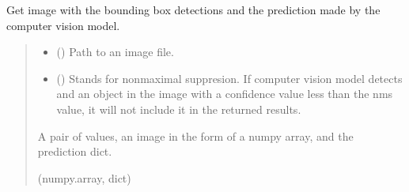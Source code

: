 \documentclass[letterpaper,10pt,english]{sphinxmanual}
\begin{document}
\begin{fulllineitems}
\begin{fulllineitems}
\begin{quote}
\begin{description}
\end{description}\end{quote}

\end{fulllineitems}


\begin{fulllineitems}
\label{\detokenize{comp_viz.object_detection:comp_viz.object_detection.model.Model.get_image_prediction}}
\pysigstartsignatures
{}
\pysigstopsignatures
\sphinxAtStartPar
Get image with the bounding box detections and the prediction made by the computer vision model.
\begin{quote}\begin{description}
\begin{itemize}
\item {} 
\sphinxAtStartPar
{} () \textendash{} Path to an image file.

\item {} 
\sphinxAtStartPar
{} () \textendash{} Stands for non\sphinxhyphen{}maximal suppresion. If computer vision model detects and an 
object in the image with a confidence value less than the nms value, it 
will not include it in the returned results.

\end{itemize}

\sphinxAtStartPar
A pair of values, an image in the form of a numpy array, and the prediction dict.

\sphinxAtStartPar
(numpy.array, dict)

\end{description}\end{quote}

\end{fulllineitems}



\end{fulllineitems}
\end{document}
